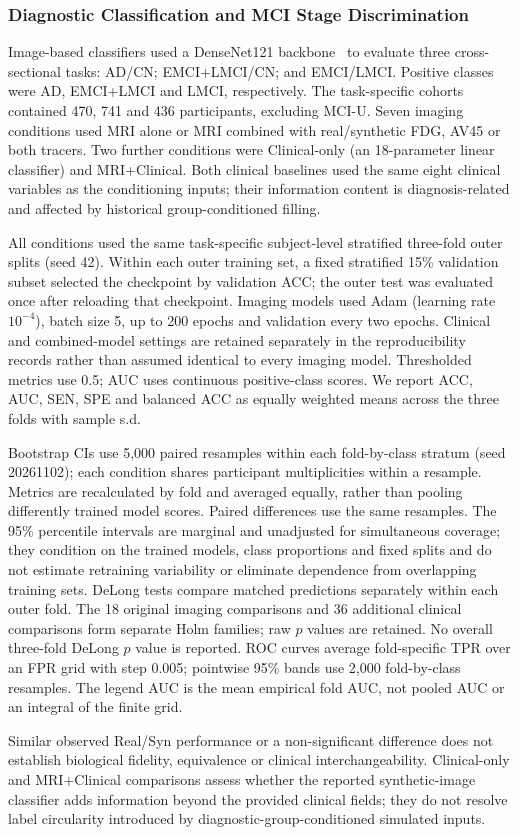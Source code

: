 \subsubsection{Diagnostic Classification and MCI Stage Discrimination}
Image-based classifiers used a DenseNet121 backbone~\cite{huang2017densely} to evaluate three cross-sectional tasks: AD/CN; EMCI+LMCI/CN; and EMCI/LMCI. Positive classes were AD, EMCI+LMCI and LMCI, respectively. The task-specific cohorts contained 470, 741 and 436 participants, excluding MCI-U. Seven imaging conditions used MRI alone or MRI combined with real/synthetic FDG, AV45 or both tracers. Two further conditions were Clinical-only (an 18-parameter linear classifier) and MRI+Clinical. Both clinical baselines used the same eight clinical variables as the conditioning inputs; their information content is diagnosis-related and affected by historical group-conditioned filling.

All conditions used the same task-specific subject-level stratified three-fold outer splits (seed 42). Within each outer training set, a fixed stratified 15\% validation subset selected the checkpoint by validation ACC; the outer test was evaluated once after reloading that checkpoint. Imaging models used Adam (learning rate $10^{-4}$), batch size 5, up to 200 epochs and validation every two epochs. Clinical and combined-model settings are retained separately in the reproducibility records rather than assumed identical to every imaging model. Thresholded metrics use 0.5; AUC uses continuous positive-class scores. We report ACC, AUC, SEN, SPE and balanced ACC as equally weighted means across the three folds with sample s.d.

Bootstrap CIs use 5,000 paired resamples within each fold-by-class stratum (seed 20261102); each condition shares participant multiplicities within a resample. Metrics are recalculated by fold and averaged equally, rather than pooling differently trained model scores. Paired differences use the same resamples. The 95\% percentile intervals are marginal and unadjusted for simultaneous coverage; they condition on the trained models, class proportions and fixed splits and do not estimate retraining variability or eliminate dependence from overlapping training sets. DeLong tests compare matched predictions separately within each outer fold. The 18 original imaging comparisons and 36 additional clinical comparisons form separate Holm families; raw $p$ values are retained. No overall three-fold DeLong $p$ value is reported. ROC curves average fold-specific TPR over an FPR grid with step 0.005; pointwise 95\% bands use 2,000 fold-by-class resamples. The legend AUC is the mean empirical fold AUC, not pooled AUC or an integral of the finite grid.

Similar observed Real/Syn performance or a non-significant difference does not establish biological fidelity, equivalence or clinical interchangeability. Clinical-only and MRI+Clinical comparisons assess whether the reported synthetic-image classifier adds information beyond the provided clinical fields; they do not resolve label circularity introduced by diagnostic-group-conditioned simulated inputs.
